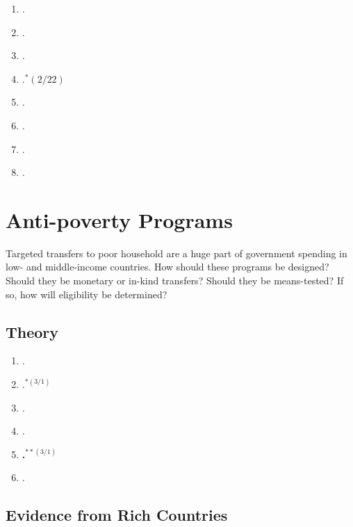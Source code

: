 \documentclass[11pt]{article}
\begin{document}

\begin{enumerate}
\item {}.
\item {}.
\item {}.
\item {}.$^{*}(2/22)$
\item {}.
\item {}.
\item {}.
\item {}.
\end{enumerate}

\section{ Anti-poverty Programs}
Targeted transfers to poor household are a huge part of government spending in low- and middle-income countries. How should these programs be designed? Should they be monetary or in-kind transfers? Should they be means-tested? If so, how will eligibility be determined?


\subsection{Theory}

\begin{enumerate}
\item {}.
\item {}.$^{*(3/1)}$
\item {}.
\item {}.
\item \textbf{.$^{**(3/1)}$}
\item {}.
\end{enumerate}

\subsection{Evidence from Rich Countries}
\end{document}
